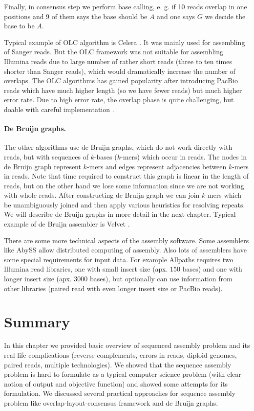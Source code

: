 Finally, in consensus step we perform base calling, e. g. if 10 reads overlap in
one positions and 9 of them says the base should be $A$ and one says $G$ we decide the base to
be $A$.

Typical example of OLC algorithm is Celera \citep{Celera}.
It was mainly used for assembling of Sanger reads. But the OLC
framework was not suitable for assembling Illumina reads due to large number
of rather short reads (three to ten times shorter than Sanger reads), which
would dramatically increase the number of overlaps. 
The OLC algorithms has gained popularity after introducing PacBio reads
which have much higher length (so we have fewer reads) but much higher error rate.
Due to high error rate, the overlap phase is quite challenging, but
doable with careful implementation \citep{myers2014efficient}. 

\paragraph{De Bruijn graphs.}
The other algorithms use de Bruijn graphs, which do not work directly with reads, but
with sequences of $k$-bases ($k$-mers) which occur in reads. The nodes in de Bruijn graph represent $k$-mers
and edges represent adjacencies between $k$-mers in reads. Note that time
required to construct this graph is linear in the length of reads, but on the other hand
we lose some information since we are not working with whole reads.
After constructing de Bruijn graph we can join $k$-mers which be
unambiguously joined and then apply various heuristics for resolving repeats.
We will describe de Bruijn graphs in more detail in the next chapter.
Typical example of de Bruijn assembler is Velvet \citep{Velvet}.

\bigskip

There are some more technical aspects of the assembly software.
Some assemblers like AbySS \citep{Abyss} allow distributed computing
of assembly. Also lots of assemblers
have some special requirements for input data. For example
Allpaths \citep{allpaths} requires two Illumina read libraries, one
with small insert size (apx. $150$ bases) and one with longer insert
size (apx. $3000$ bases), but optionally can use information from other libraries
(paired read with even longer insert size or PacBio reads).

\section{Summary}

In this chapter we provided basic overview of sequenced assembly problem
and its real life complications (reverse complements, errors in reads,
diploid genomes, paired reads, multiple technologies). 
We showed that the sequence assembly problem is hard to formulate
as a typical computer science problem (with clear notion of output and objective function)
and showed some attempts for its formulation.
We discussed several practical approaches for sequence assembly problem like
overlap-layout-consensus framework and de Bruijn graphs.

